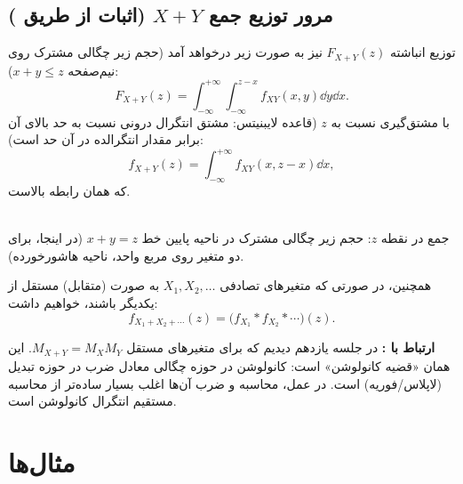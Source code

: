 \subsection{مرور توزیع جمع $X+Y$ (اثبات از طریق )}
توزیع انباشته $F_{X+Y}(z)$ نیز به صورت زیر درخواهد آمد (حجم زیر چگالی مشترک روی نیم‌صفحه $x+y\le z$):
\[
F_{X+Y}(z)=\int_{-\infty}^{+\infty}\int_{-\infty}^{z-x}f_{XY}(x,y)\dd y\dd x .
\]
با مشتق‌گیری نسبت به $z$ (قاعده لایبنیتس: مشتق انتگرال درونی نسبت به حد بالای آن برابر مقدار انتگرالده در آن حد است):
\[
f_{X+Y}(z)=\int_{-\infty}^{+\infty}f_{XY}(x,z-x)\dd x ,
\]
که همان رابطه بالاست.

\begin{center}
\\
{\small {} جمع در نقطه $z$: حجم زیر چگالی مشترک در ناحیه پایین خط $x+y=z$ (در اینجا، برای دو متغیر روی مربع واحد، ناحیه هاشورخورده).}
\end{center}

همچنین، در صورتی که متغیرهای تصادفی $X_1,X_2,\ldots$ به صورت (متقابل) مستقل از یکدیگر باشند، خواهیم داشت:
\[
f_{X_1+X_2+\cdots}(z)=\big(f_{X_1}*f_{X_2}*\cdots\big)(z).
\]

\begin{note}
\notetitle \textbf{ارتباط با :} در جلسه یازدهم دیدیم که برای متغیرهای مستقل $M_{X+Y}=M_XM_Y$. این همان «قضیه کانولوشن» است: کانولوشن در حوزه چگالی معادل ضرب در حوزه تبدیل (لاپلاس/فوریه) است. در عمل، محاسبه  و ضرب آن‌ها اغلب بسیار ساده‌تر از محاسبه مستقیم انتگرال کانولوشن است.
\end{note}

\section{مثال‌ها}

